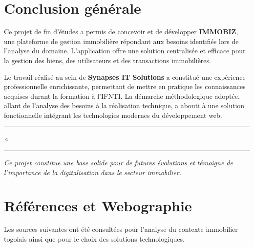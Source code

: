 \documentclass[12pt,a4paper]{report}
\newcommand{\motcle}[1]{\textcolor{marine}{\textbf{#1}}}
\newcommand{\important}[1]{\textcolor{cuivre}{\textbf{#1}}}
\newcommand{\separateur}{%
    \vspace{0.5cm}%
    \begin{center}%
        \textcolor{grismoyen}{\rule{2cm}{0.4pt}}%
        \hspace{0.5em}%
        \textcolor{cuivre}{$\diamond$}%
        \hspace{0.5em}%
        \textcolor{grismoyen}{\rule{2cm}{0.4pt}}%
    \end{center}%
    \vspace{0.3cm}%
}
\begin{document}
\newpage

\chapter*{Conclusion générale}

\begin{highlightbox}
Ce projet de fin d'études a permis de concevoir et de développer \motcle{IMMOBIZ}, une plateforme de gestion immobilière répondant aux besoins identifiés lors de l'analyse du domaine. L'application offre une solution centralisée et efficace pour la gestion des biens, des utilisateurs et des transactions immobilières.
\end{highlightbox}

\vspace{0.4cm}

Le travail réalisé au sein de \important{Synapses IT Solutions} a constitué une expérience professionnelle enrichissante, permettant de mettre en pratique les connaissances acquises durant la formation à l'IFNTI. La démarche méthodologique adoptée, allant de l'analyse des besoins à la réalisation technique, a abouti à une solution fonctionnelle intégrant les technologies modernes du développement web.

\vspace{0.4cm}


\separateur

\begin{center}
    \textit{\textcolor{bleugris}{Ce projet constitue une base solide pour de futures évolutions et témoigne de l'importance de la digitalisation dans le secteur immobilier.}}
\end{center}




\newpage
\chapter*{Références et Webographie}

\begin{infobox}
Les sources suivantes ont été consultées pour l'analyse du contexte immobilier togolais ainsi que pour le choix des solutions technologiques.
\end{infobox}
\end{document}
